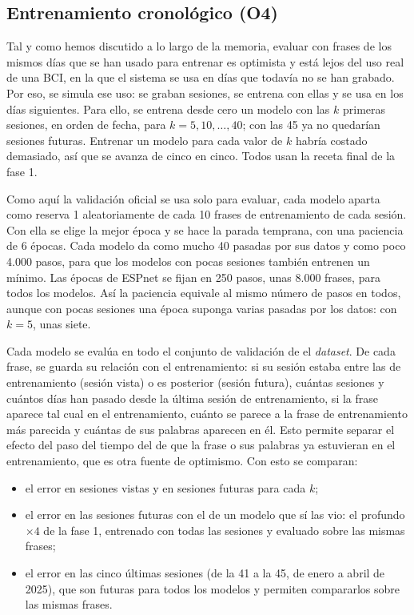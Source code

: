 \subsection{Entrenamiento cronológico (O4)}

Tal y como hemos discutido a lo largo de la memoria, evaluar con frases de los mismos días que se han usado para entrenar es optimista y está lejos del uso real de una BCI, en la que el sistema se usa en días que todavía no se han grabado. Por eso, se simula ese uso: se graban sesiones, se entrena con ellas y se usa en los días siguientes. Para ello, se entrena desde cero un modelo con las $k$ primeras sesiones, en orden de fecha, para $k = 5, 10, \dots, 40$; con las 45 ya no quedarían sesiones futuras. Entrenar un modelo para cada valor de $k$ habría costado demasiado, así que se avanza de cinco en cinco. Todos usan la receta final de la fase 1.

Como aquí la validación oficial se usa solo para evaluar, cada modelo aparta como reserva 1 aleatoriamente de cada 10 frases de entrenamiento de cada sesión. Con ella se elige la mejor época y se hace la parada temprana, con una paciencia de 6 épocas. Cada modelo da como mucho 40 pasadas por sus datos y como poco 4.000 pasos, para que los modelos con pocas sesiones también entrenen un mínimo. Las épocas de ESPnet se fijan en 250 pasos, unas 8.000 frases, para todos los modelos. Así la paciencia equivale al mismo número de pasos en todos, aunque con pocas sesiones una época suponga varias pasadas por los datos: con $k = 5$, unas siete.

Cada modelo se evalúa en todo el conjunto de validación de el \textit{dataset}. De cada frase, se guarda su relación con el entrenamiento: si su sesión estaba entre las de entrenamiento (sesión vista) o es posterior (sesión futura), cuántas sesiones y cuántos días han pasado desde la última sesión de entrenamiento, si la frase aparece tal cual en el entrenamiento, cuánto se parece a la frase de entrenamiento más parecida y cuántas de sus palabras aparecen en él. Esto permite separar el efecto del paso del tiempo del de que la frase o sus palabras ya estuvieran en el entrenamiento, que es otra fuente de optimismo. Con esto se comparan:

\begin{itemize}[leftmargin=*, itemsep=0.3em]
  \item el error en sesiones vistas y en sesiones futuras para cada $k$;
  \item el error en las sesiones futuras con el de un modelo que sí las vio: el profundo $\times 4$ de la fase 1, entrenado con todas las sesiones y evaluado sobre las mismas frases;
  \item el error en las cinco últimas sesiones (de la 41 a la 45, de enero a abril de 2025), que son futuras para todos los modelos y permiten compararlos sobre las mismas frases.
\end{itemize}

